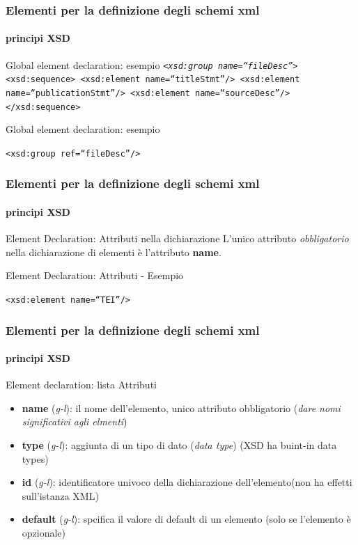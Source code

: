 \begin{frame}
	\frametitle{Elementi per la definizione degli schemi xml}
	\framesubtitle{principi XSD}
	\addtocounter{nframe}{1}


	\begin{block}{Global element declaration: esempio}
		\texttt{\emph{<xsd:group name=``fileDesc''>}
			<xsd:sequence>
			<xsd:element name=``titleStmt''/>
			<xsd:element name=``publicationStmt''/>
			<xsd:element name=``sourceDesc''/>
			</xsd:sequence>
		}
	\end{block}

	\begin{block}{Global element declaration: esempio}
		\begin{center} \texttt{<xsd:group ref=``fileDesc''/>}\end{center}
	\end{block}

\end{frame}

\begin{frame}
	\frametitle{Elementi per la definizione degli schemi xml}
	\framesubtitle{principi XSD}
	\addtocounter{nframe}{1}

	\begin{block}{Element Declaration: Attributi nella dichiarazione}
		L'unico attributo \textit{obbligatorio} nella dichiarazione di elementi è l'attributo \textbf{name}.
	\end{block}

	\begin{block}{Element Declaration: Attributi - Esempio}
		\begin{center}\texttt{<xsd:element name=``TEI''/> }\end{center}
	\end{block}

\end{frame}

\begin{frame}
	\frametitle{Elementi per la definizione degli schemi xml}
	\framesubtitle{principi XSD}
	\addtocounter{nframe}{1}

	\begin{block}{Element declaration: lista Attributi}
		\begin{itemize}
			\item \textbf{name} (\textit{g-l}): il nome dell'elemento, unico attributo obbligatorio (\textit{dare nomi significativi agli elmenti})
			\item \textbf{type} (\textit{g-l}): aggiunta di un tipo di dato (\textit{data type}) (XSD ha buint-in data types)
			\item \textbf{id} (\textit{g-l}): identificatore univoco della dichiarazione dell'elemento(non ha effetti sull'istanza XML)
			\item \textbf{default} (\textit{g-l}): spcifica il valore di default di un elemento (solo se l'elemento è opzionale)
		\end{itemize}

	\end{block}

\end{frame}

